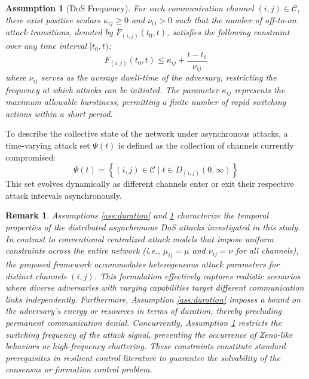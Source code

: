 \documentclass[lettersize,journal]{IEEEtran}
\newtheorem{assumption}{Assumption}
\newtheorem{remark}{Remark}
\begin{document}
\begin{assumption}[DoS Frequency]
	\label{ass:frequency}
	For each communication channel $(i, j) \in {\mathcal{C}}$, there exist positive scalars $\kappa_{ij} \ge 0$ and $\nu_{ij} > 0$ such that the number of off-to-on attack transitions, denoted by $F_{(i,j)}(t_0, t)$, satisfies the following constraint over any time interval $[t_0, t)$:
	\begin{equation}
		F_{(i,j)}(t_0, t) \le \kappa_{ij} + \frac{t - t_0}{\nu_{ij}}
	\end{equation}
	where $\nu_{ij}$ serves as the average dwell-time of the adversary, restricting the frequency at which attacks can be initiated. The parameter $\kappa_{ij}$ represents the maximum allowable burstiness, permitting a finite number of rapid switching actions within a short period.
\end{assumption}

To describe the collective state of the network under asynchronous attacks, a time-varying attack set $\Psi(t)$ is defined as the collection of channels currently compromised:
\begin{equation}
	\Psi(t) = \left\{ (i,j) \in {\mathcal{C}} \mid t \in D_{(i,j)}(0,\infty) \right\}
\end{equation}
This set evolves dynamically as different channels enter or exit their respective attack intervals asynchronously. 
\vspace{1mm}
\begin{remark}
	Assumptions \ref{ass:duration} and \ref{ass:frequency} characterize the temporal properties of the distributed asynchronous DoS attacks investigated in this study. In contrast to conventional centralized attack models that impose uniform constraints across the entire network (i.e., $\mu_{ij} = \mu$ and $\nu_{ij} = \nu$ for all channels), the proposed framework accommodates heterogeneous attack parameters for distinct channels $(i, j)$. This formulation effectively captures realistic scenarios where diverse adversaries with varying capabilities target different communication links independently. Furthermore, Assumption \ref{ass:duration} imposes a bound on the adversary's energy or resources in terms of duration, thereby precluding permanent communication denial. Concurrently, Assumption \ref{ass:frequency} restricts the switching frequency of the attack signal, preventing the occurrence of Zeno-like behaviors or high-frequency chattering. These constraints constitute standard prerequisites in resilient control literature to guarantee the solvability of the consensus or formation control problem.
\end{remark}
\vspace{1mm}
\end{document}

